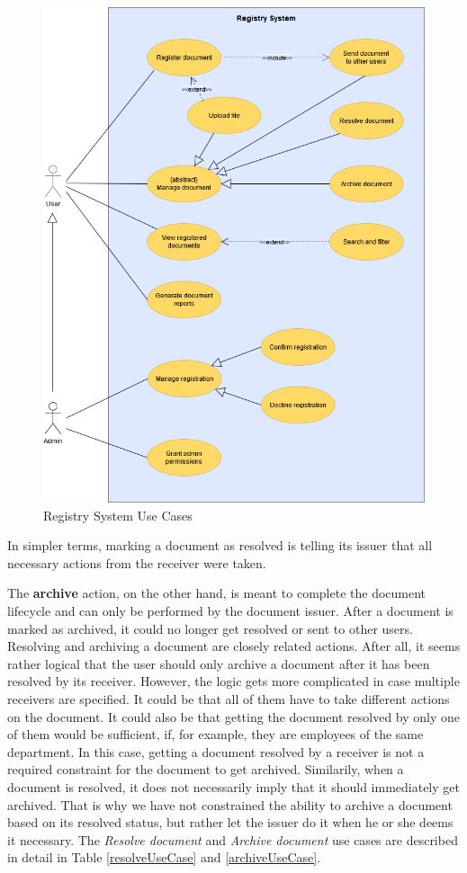 \begin{figure}[H]
    \centering
    \includegraphics[width=5in]{images/useCase}
    \caption{Registry System Use Cases}
    \label{useCase}
\end{figure}

In simpler terms, marking a document as resolved is telling its issuer that all necessary actions from the receiver were taken.

The \textbf{archive} action, on the other hand, is meant to complete the document lifecycle and can only be performed by the document issuer. After a document is marked as archived, it could no longer get resolved or sent to other users. Resolving and archiving a document are closely related actions. After all, it seems rather logical that the user should only archive a document after it has been resolved by its receiver. However, the logic gets more complicated in case multiple receivers are specified. It could be that all of them have to take different actions on the document. It could also be that getting the document resolved by only one of them would be sufficient, if, for example, they are employees of the same department. In this case, getting a document resolved by a receiver is not a required constraint for the document to get archived. Similarily, when a document is resolved, it does not necessarily imply that it should immediately get archived. That is why we have not constrained the ability to archive a document based on its resolved status, but rather let the issuer do it when he or she deems it necessary. The \textit{Resolve document} and \textit{Archive document} use cases are described in detail in Table \ref{resolveUseCase} and \ref{archiveUseCase}.

